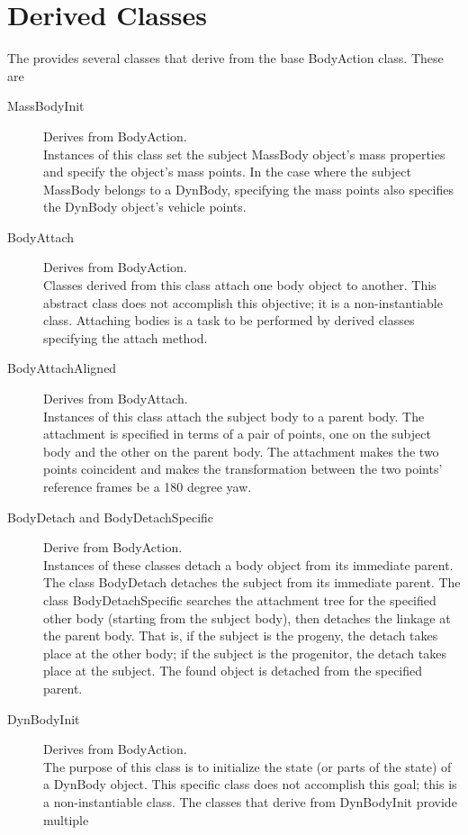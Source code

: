 \section*{\ModelDesc Derived Classes}

The \ModelDesc provides several classes that derive from the base BodyAction
class. These are
\begin{description}
\item[MassBodyInit] Derives from BodyAction. \\
Instances of this class set the subject MassBody object's
mass properties and specify the object's mass points.
In the case where the subject MassBody belongs to a DynBody,
specifying the mass points also specifies the DynBody object's
vehicle points.
\item[BodyAttach] Derives from BodyAction. \\
Classes derived from this class attach one body object to another.
This abstract class does not accomplish this objective;
it is a non-instantiable class. Attaching bodies is a task to be
performed by derived classes specifying the attach method.
\item[BodyAttachAligned] Derives from BodyAttach. \\
Instances of this class attach the subject body to a parent body.
The attachment is specified in terms of a pair of points, one on the subject body and the other on the parent body. 
The attachment makes the two
points coincident and makes the transformation between the two
points' reference frames be a 180 degree yaw.
\item[BodyDetach and BodyDetachSpecific] Derive from BodyAction. \\
Instances of these classes detach a body object
from its immediate parent.
The class BodyDetach detaches the subject from its
immediate parent. The class BodyDetachSpecific searches the attachment tree
for the specified other body (starting from the subject body), then detaches the
linkage at the parent body. That is, if the subject is the progeny, the detach
takes place at the other body; if the subject is the progenitor, the detach
takes place at the subject.
The found object is detached from the specified parent.
\item[DynBodyInit] Derives from BodyAction. \\
The purpose of this class is to initialize the state (or parts
of the state) of a DynBody object.
This specific class does not accomplish this goal;
this is a non-instantiable class.
The classes that derive from DynBodyInit provide multiple

\end{description}
